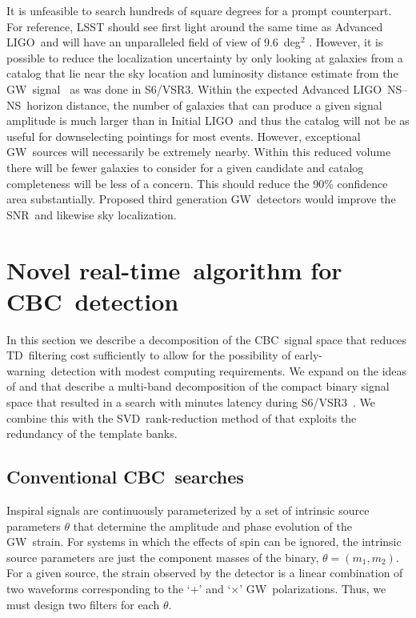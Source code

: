 \documentclass[preprint2]{aastex}
\newcommand{\earlywarning}{early-warning}
\newcommand{\NS}{NS}
\newcommand{\GW}{GW}%
\newcommand{\CBC}{CBC}%
\newcommand{\LIGO}{LIGO}%
\newcommand{\SNR}{SNR}%
\newcommand{\realtime}{real-time}
\newcommand{\SVD}{SVD}%
\newcommand{\TD}{TD}%
\begin{document}
It is unfeasible to search hundreds of square degrees for a prompt counterpart.
For reference, LSST should see first light around the same time as
Advanced \LIGO\ and will have an unparalleled field of view of 9.6~deg$^2$
\citep{2008arXiv0805.2366I}.  However, 
it is possible to reduce the localization uncertainty by only looking at
galaxies from a catalog that lie near the sky location and luminosity distance
estimate from the \GW\ signal~\citep{galaxy-catalog} as was done in S6/VSR3.
Within the expected Advanced \LIGO\ \NS--\NS\ horizon distance,
the number of galaxies that can produce a given signal amplitude is much larger
than in Initial \LIGO\ and thus the catalog will not be as useful
for downselecting pointings for most events. However, exceptional \GW\ sources will
necessarily be extremely nearby. Within this reduced volume there will be fewer
galaxies to consider for a given candidate and catalog completeness will be
less of a concern.  This should reduce the 90\% confidence area substantially.
Proposed third generation \GW\ detectors would improve the \SNR\ and likewise
sky localization.

\section{Novel \realtime\ algorithm for \CBC\ detection}
\label{sec:method}

In this section we describe a decomposition of the \CBC\ signal space that
reduces \TD\ filtering cost sufficiently to allow for the
possibility of \earlywarning\ detection with modest computing requirements.  We
expand on the ideas of \citet{Marion2004} and \citet{Buskulic2010} that describe a
multi-band decomposition of the compact binary signal space that resulted in
a search with minutes latency during S6/VSR3~\citep{HugheyGWPAW2011}.  We combine this
with the \SVD\ rank-reduction method of \citet{Cannon:2010p10398} that exploits
the redundancy of the template banks.

\subsection{Conventional \CBC\ searches}

Inspiral signals are continuously parameterized by a set of intrinsic source
parameters $\theta$ that determine the amplitude and phase evolution of the
\GW\ strain. For systems in which the effects of spin can be ignored, the intrinsic
source parameters are just the component masses of the binary,
 $\theta = (m_1, m_2)$. For a given source, the strain observed by the
 detector is a linear combination of two waveforms corresponding to the
`$+$' and `$\times$' \GW\ polarizations.  Thus, we must design two filters
for each $\theta$.
\end{document}
